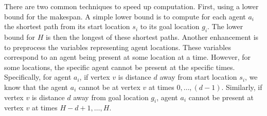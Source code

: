 There are two common techniques to speed up computation. First, using a lower bound for the makespan. %
A simple lower bound is to compute for each agent $a_i$ the shortest path from its start location $s_i$ to its goal location $g_i$. The lower bound for $H$ is then the longest of these shortest paths. %
%
Another enhancement is to pre\-pro\-cess the variables representing agent locations. These variables correspond to an agent being present at some location at a time. However, for some locations, the specific agent cannot be present at the specific times. %
Specifically, for agent $a_i$, if vertex $v$ is distance $d$ away from start location $s_i$, we know that the agent $a_i$ cannot be at vertex $v$ at times $0,\dots,(d-1)$. %
Similarly, if vertex $v$ is distance $d$ away from goal location $g_i$, agent $a_i$ cannot be present at vertex $v$ at times $H-d+1,\dots,H$. %
%
%
